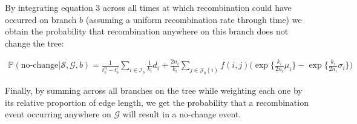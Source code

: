 \documentclass[11pt]{article}
\begin{document}
\noindent By integrating equation 3 across all times at which recombination could
have occurred on branch $b$ (assuming a uniform recombination rate through time) 
we obtain the probability that recombination anywhere on this branch does not 
change the tree:


\begin{equation}
\begin{aligned}
	\mathbb{P}(\textrm{no-change} | \mathcal{S},\mathcal{G},b) = 
	\frac{1}{t_b^u - t_b^l}
	\sum_{i \in \mathcal{I}_b} \frac{1}{k_i} d_i + 
	\frac{2n_i}{k_i} 
	\sum_{j \in \mathcal{J}_b(i)}f(i,j)
	\bigg(
		\exp\bigg\{\frac{k_i}{2n_i}\mu_i \bigg\} - 
		\exp\bigg\{\frac{k_i}{2n_i}\sigma_i \bigg\}
	\bigg)
\end{aligned}
\end{equation}


\noindent Finally, by summing across all branches on the tree 
while weighting each one by its relative proportion of edge length,
we get the probability that a recombination event occurring anywhere on 
$\mathcal{G}$ will result in a no-change event. %
\end{document}

